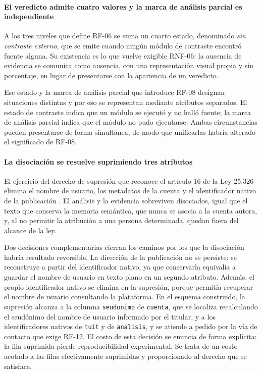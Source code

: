 \paragraph{El veredicto admite cuatro valores y la marca de análisis parcial es independiente}

A los tres niveles que define RF-06 se suma un cuarto estado, denominado \textit{sin contraste externo}, que se emite cuando ningún módulo de contraste encontró fuente alguna. Su existencia es lo que vuelve exigible RNF-06: la ausencia de evidencia se comunica como ausencia, con una representación visual propia y sin porcentaje, en lugar de presentarse con la apariencia de un veredicto.

Ese estado y la marca de análisis parcial que introduce RF-08 designan situaciones distintas y por eso se representan mediante atributos separados. El estado de contraste indica que un módulo se ejecutó y no halló fuente; la marca de análisis parcial indica que el módulo no pudo ejecutarse. Ambas circunstancias pueden presentarse de forma simultánea, de modo que unificarlas habría alterado el significado de RF-08.

\paragraph{La disociación se resuelve suprimiendo tres atributos}

El ejercicio del derecho de supresión que reconoce el artículo 16 de la Ley 25.326 elimina el nombre de usuario, los metadatos de la cuenta y el identificador nativo de la publicación \parencite{CongresoNacion2000}. El análisis y la evidencia sobreviven disociados, igual que el texto que conserva la memoria semántica, que nunca se asocia a la cuenta autora, y, al no permitir la atribución a una persona determinada, quedan fuera del alcance de la ley.

Dos decisiones complementarias cierran los caminos por los que la disociación habría resultado reversible. La dirección de la publicación no se persiste: se reconstruye a partir del identificador nativo, ya que conservarla equivalía a guardar el nombre de usuario en texto plano en un segundo atributo. Además, el propio identificador nativo se elimina en la supresión, porque permitía recuperar el nombre de usuario consultando la plataforma. En el esquema construido, la supresión alcanza a la columna \texttt{seudonimo} de \texttt{cuenta}, que se localiza recalculando el seudónimo del nombre de usuario informado por el titular, y a los identificadores nativos de \texttt{tuit} y de \texttt{analisis}, y se atiende a pedido por la vía de contacto que exige RF-12. El costo de esta decisión se enuncia de forma explícita: la fila suprimida pierde reproducibilidad experimental. Se trata de un costo acotado a las filas efectivamente suprimidas y proporcionado al derecho que se satisface.

